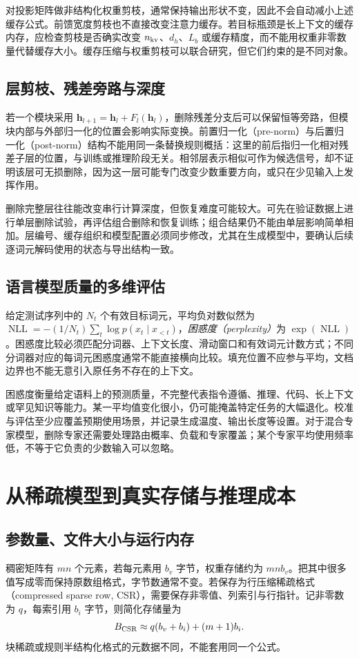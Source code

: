 \documentclass[UTF8,12pt,a4paper,fontset=fandol]{ctexart}
\begin{document}
对投影矩阵做非结构化权重剪枝，通常保持输出形状不变，因此不会自动减小上述缓存公式。前馈宽度剪枝也不直接改变注意力缓存。若目标瓶颈是长上下文的缓存内存，应检查剪枝是否确实改变 $n_{\rm kv}$、$d_h$、$L_b$ 或缓存精度，而不能用权重非零数量代替缓存大小。缓存压缩与权重剪枝可以联合研究，但它们约束的是不同对象。

\subsection{层剪枝、残差旁路与深度}
若一个模块采用 $\mathbf h_{l+1}=\mathbf h_l+F_l(\mathbf h_l)$，删除残差分支后可以保留恒等旁路，但模块内部与外部归一化的位置会影响实际变换。前置归一化（pre-norm）与后置归一化（post-norm）结构不能用同一条替换规则概括：这里的前后指归一化相对残差子层的位置，与训练或推理阶段无关。相邻层表示相似可作为候选信号，却不证明该层可无损删除，因为这一层可能专门改变少数重要方向，或只在少见输入上发挥作用。

删除完整层往往能改变串行计算深度，但恢复难度可能较大。可先在验证数据上进行单层删除试验，再评估组合删除和恢复训练；组合结果仍不能由单层影响简单相加。层编号、缓存组织和模型配置必须同步修改，尤其在生成模型中，要确认后续逐词元解码使用的状态与导出结构一致。

\subsection{语言模型质量的多维评估}
给定测试序列中的 $N_t$ 个有效目标词元，平均负对数似然为 $\operatorname{NLL}=-(1/N_t)\sum_t\log p(x_t\mid x_{<t})$，\emph{困惑度（perplexity）}为 $\exp(\operatorname{NLL})$。困惑度比较必须匹配分词器、上下文长度、滑动窗口和有效词元计数方式；不同分词器对应的每词元困惑度通常不能直接横向比较。填充位置不应参与平均，文档边界也不能无意引入原任务不存在的上下文。

困惑度衡量给定语料上的预测质量，不完整代表指令遵循、推理、代码、长上下文或罕见知识等能力。某一平均值变化很小，仍可能掩盖特定任务的大幅退化。校准与评估至少应覆盖预期使用场景，并记录生成温度、输出长度等设置。对于混合专家模型，删除专家还需要处理路由概率、负载和专家覆盖；某个专家平均使用频率低，不等于它负责的少数输入可以忽略。

\section{从稀疏模型到真实存储与推理成本}
\label{sec:prune-systems}

\subsection{参数量、文件大小与运行内存}
稠密矩阵有 $mn$ 个元素，若每元素用 $b_v$ 字节，权重存储约为 $mnb_v$。把其中很多值写成零而保持原数组格式，字节数通常不变。若保存为行压缩稀疏格式（compressed sparse row, CSR），需要保存非零值、列索引与行指针。记非零数为 $q$，每索引用 $b_i$ 字节，则简化存储量为
\begin{equation}
 B_{\rm CSR}\approx q(b_v+b_i)+(m+1)b_i.
 \label{eq:prune-csr}
\end{equation}
块稀疏或规则半结构化格式的元数据不同，不能套用同一个公式。
\end{document}
